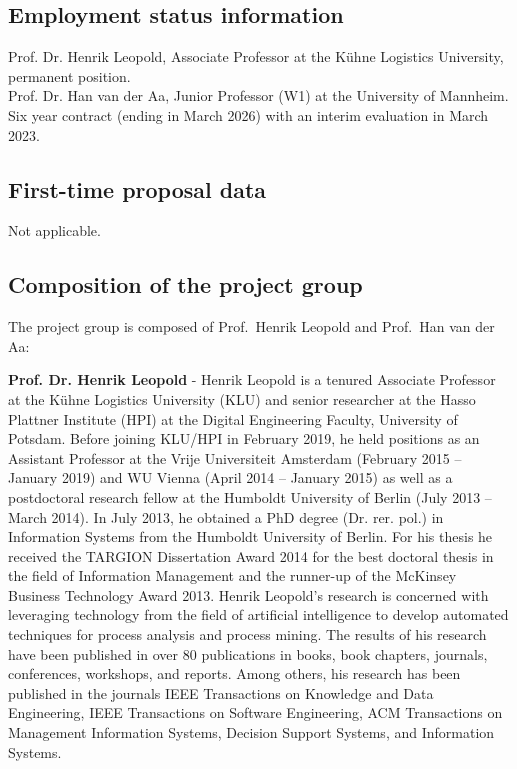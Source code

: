 

\subsection{Employment status information}

Prof. Dr. Henrik Leopold, Associate Professor at the Kühne Logistics University, permanent position.\\
Prof. Dr. Han van der Aa, Junior Professor (W1) at the University of Mannheim. Six year contract (ending in March 2026) with an interim evaluation in March 2023.

\subsection{First-time proposal data}

Not applicable.

\subsection{Composition of the project group}

The project group is composed of Prof.\ Henrik Leopold and Prof.\ Han van der Aa:


\textbf{Prof. Dr. Henrik Leopold} - Henrik Leopold is a tenured Associate Professor at the K\"uhne Logistics University (KLU) and senior researcher at the Hasso Plattner Institute (HPI) at the Digital Engineering Faculty, University of Potsdam. Before joining KLU/HPI in February 2019, he held positions as an Assistant Professor at the Vrije Universiteit Amsterdam (February 2015 – January 2019) and WU Vienna (April 2014 – January 2015) as well as a postdoctoral research fellow at the Humboldt University of Berlin (July 2013 – March 2014). In July 2013, he obtained a PhD degree (Dr. rer. pol.) in Information Systems from the Humboldt University of Berlin. For his thesis he received the TARGION Dissertation Award 2014 for the best doctoral thesis in the field of Information Management and the runner-up of the McKinsey Business Technology Award 2013. Henrik Leopold's research is concerned with leveraging technology from the field of artificial intelligence to develop automated techniques for process analysis and process mining. The results of his research have been published in over 80 publications in books, book chapters, journals, conferences, workshops, and reports. Among others, his research has been published in the journals IEEE Transactions on Knowledge and Data Engineering, IEEE Transactions on Software Engineering, ACM Transactions on Management Information Systems, Decision Support Systems, and Information Systems. 

